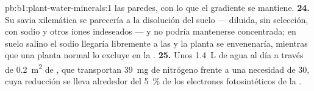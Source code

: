 \begin{solution}{pb:b1:plant-water-minerals:1}
las paredes, con lo que el gradiente se mantiene.
\textbf{24.} Su savia xilemática se parecería a la disolución del suelo ---
diluida, sin selección, con sodio y otros iones indeseados --- y no podría
mantenerse concentrada; en suelo salino el sodio llegaría libremente a las
 y la planta se envenenaría, mientras que una planta normal lo excluye
en la .
\textbf{25.} Unos \qty{1.4}{L} de agua al día a través de \qty{0.2}{m^2} de
, que transportan \qty{39}{mg} de nitrógeno frente a una necesidad de
\qty{30}{}, cuya reducción se lleva alrededor del \qty{5}{\%} de los
electrones fotosintéticos de la .
\end{solution}

